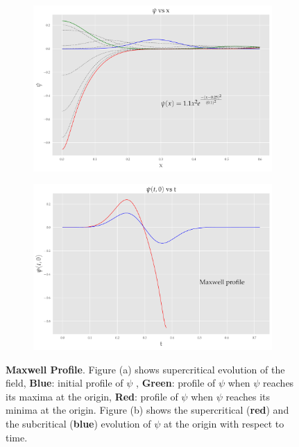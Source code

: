 \begin{figure}
    \centering
    \begin{subfigure}[b]{0.85\textwidth}
        \includegraphics[width=1\linewidth]{images/super_mod.pdf}
        \caption{}
        \label{fig:modified_gaussian}
    \end{subfigure}

    \begin{subfigure}[b]{0.85\textwidth}
        \includegraphics[width=1\linewidth]{images/at0_mod.pdf}
        \caption{}
        \label{fig:at0_modified_gaussian}
    \end{subfigure}
    \caption[Evolution of $\psi$ from an initial Maxwell profile(Modified Gaussian) profile]{\textbf{Maxwell Profile}. Figure (a) shows supercritical evolution of the field, \textbf{Blue}: initial profile of $\psi$ , \textbf{Green}: profile of $\psi$ when $\psi$ reaches its maxima at the origin, \textbf{Red}: profile of $\psi$ when $\psi$ reaches its minima at the origin. Figure (b) shows the supercritical (\textbf{red}) and the subcritical (\textbf{blue}) evolution of $\psi$ at the origin with respect to time.}
\end{figure}

